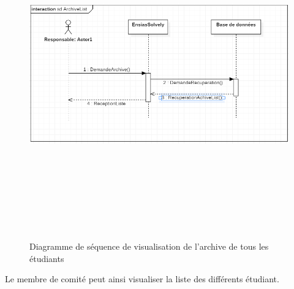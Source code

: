 \documentclass[11.5pt]{report}
\begin{document}
\begin{figure}[h]
	
	\begin{center}
		\includegraphics[width=400pt,height=400pt]{seq6.png} 
		\caption{Diagramme de séquence de visualisation de l'archive de tous les étudiants}
	\end{center}
	
\end{figure}
\newpage
Le membre de comité peut ainsi visualiser la liste des différents étudiant.\\
\end{document}
